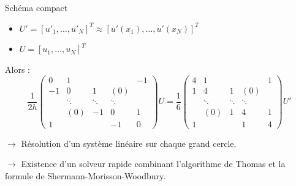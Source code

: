 \documentclass[11pt]{beamer}
\begin{document}
\begin{frame}
\begin{block}{Schéma compact}
\begin{itemize}
\item $U' = \left[ u'_1, \hdots ,u'_N \right]^T \approx \left[ u'(x_1), \hdots ,u'(x_N) \right]^T$

\item $U = \left[ u_1, \hdots ,u_N \right]^T$
\end{itemize}

\pause

Alors :
$$\dfrac{1}{2h}\begin{pmatrix}
0 & 1 &   &   & -1 \\ 
-1 & 0 & 1 & (0) &   \\ 
  & \ddots & \ddots & \ddots &   \\ 
  & (0) & -1 & 0 & 1 \\ 
1 &   &   & -1 & 0
\end{pmatrix} U = \dfrac{1}{6} \begin{pmatrix}
4 & 1 &   &   & 1 \\ 
1 & 4 & 1 & (0) &   \\ 
  & \ddots & \ddots & \ddots &   \\ 
  & (0) & 1 & 4 & 1 \\ 
1 &   &   & 1 & 4
\end{pmatrix} U'$$
\end{block}
\pause
$\rightarrow$ Résolution d'un système linéaire sur chaque grand cercle.

$\rightarrow$ Existence d'un solveur rapide combinant l'algorithme de Thomas et la formule de Shermann-Morisson-Woodbury.
\end{frame}

\end{document}
